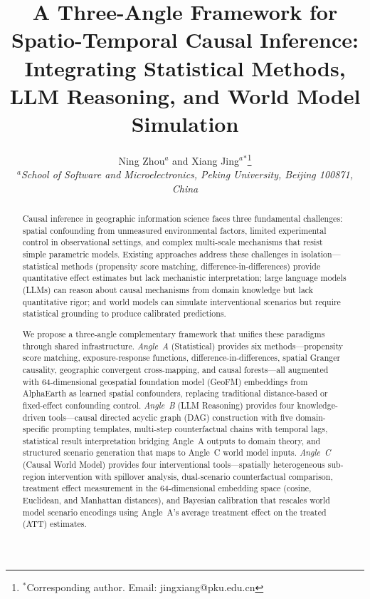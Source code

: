 \documentclass{article}
\begin{document}
\title{A Three-Angle Framework for Spatio-Temporal Causal Inference:\\Integrating Statistical Methods, LLM Reasoning, and World Model Simulation}

\author{Ning Zhou$^{a}$ and Xiang Jing$^{a}$$^{\ast}$\thanks{$^\ast$Corresponding author. Email: jingxiang@pku.edu.cn}\\
$^{a}${\em School of Software and Microelectronics, Peking University, Beijing 100871, China}}

\date{}
\maketitle

\begin{abstract}
Causal inference in geographic information science faces three fundamental challenges: spatial confounding from unmeasured environmental factors, limited experimental control in observational settings, and complex multi-scale mechanisms that resist simple parametric models. Existing approaches address these challenges in isolation---statistical methods (propensity score matching, difference-in-differences) provide quantitative effect estimates but lack mechanistic interpretation; large language models (LLMs) can reason about causal mechanisms from domain knowledge but lack quantitative rigor; and world models can simulate interventional scenarios but require statistical grounding to produce calibrated predictions.

We propose a three-angle complementary framework that unifies these paradigms through shared infrastructure. \textit{Angle~A} (Statistical) provides six methods---propensity score matching, exposure-response functions, difference-in-differences, spatial Granger causality, geographic convergent cross-mapping, and causal forests---all augmented with 64-dimensional geospatial foundation model (GeoFM) embeddings from AlphaEarth as learned spatial confounders, replacing traditional distance-based or fixed-effect confounding control. \textit{Angle~B} (LLM Reasoning) provides four knowledge-driven tools---causal directed acyclic graph (DAG) construction with five domain-specific prompting templates, multi-step counterfactual chains with temporal lags, statistical result interpretation bridging Angle~A outputs to domain theory, and structured scenario generation that maps to Angle~C world model inputs. \textit{Angle~C} (Causal World Model) provides four interventional tools---spatially heterogeneous sub-region intervention with spillover analysis, dual-scenario counterfactual comparison, treatment effect measurement in the 64-dimensional embedding space (cosine, Euclidean, and Manhattan distances), and Bayesian calibration that rescales world model scenario encodings using Angle~A's average treatment effect on the treated (ATT) estimates.


\end{abstract}
\end{document}
